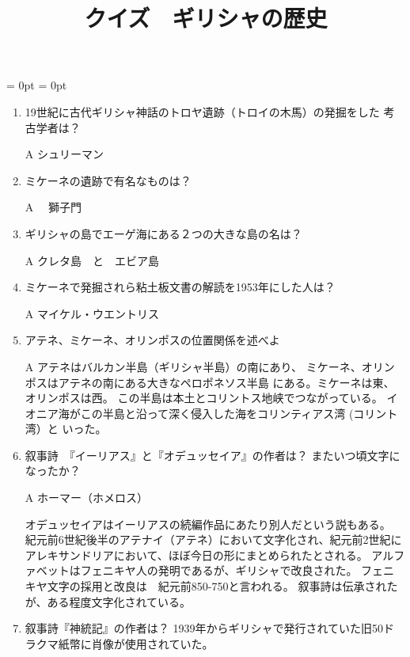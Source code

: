 \documentclass[fleqn]{article}
\begin{document}
\title{クイズ　ギリシャの歴史}
\maketitle
\hoffset = 0pt
\voffset = 0pt
\topmargin=0pt
\textheight=21cm
\headheight=0pt
\headsep=0pt


\begin{enumerate}
\item{19世紀に古代ギリシャ神話のトロヤ遺跡（トロイの木馬）の発掘をした
考古学者は？

\vspace{1zw}A 	シュリーマン
}


\item{ミケーネの遺跡で有名なものは？

\vspace{1zw}A 　獅子門

}
\item{ギリシャの島でエーゲ海にある２つの大きな島の名は？

\vspace{1zw}A クレタ島　と　エビア島

}
\item{ミケーネで発掘されら粘土板文書の解読を1953年にした人は？

\vspace{1zw}A マイケル・ウエントリス
}
\item{アテネ、ミケーネ、オリンポスの位置関係を述べよ

\vspace{1zw}A アテネはバルカン半島（ギリシャ半島）の南にあり、
ミケーネ、オリンポスはアテネの南にある大きなペロポネソス半島
にある。ミケーネは東、オリンポスは西。
この半島は本土とコリントス地峡でつながっている。
イオニア海がこの半島と沿って深く侵入した海をコリンティアス湾
(コリント湾）と	いった。

}
\item{叙事詩　『イーリアス』と『オデュッセイア』の作者は？
またいつ頃文字になったか？

\vspace{1zw}A ホーマー（ホメロス）

オデュッセイアはイーリアスの続編作品にあたり別人だという説もある。
紀元前6世紀後半のアテナイ（アテネ）において文字化され、紀元前2世紀に
アレキサンドリアにおいて、ほぼ今日の形にまとめられたとされる。
アルファベットはフェニキヤ人の発明であるが、ギリシャで改良された。
フェニキヤ文字の採用と改良は　紀元前850-750と言われる。
叙事詩は伝承されたが、ある程度文字化されている。

}
\item{叙事詩『神統記』の作者は？
1939年からギリシャで発行されていた旧50ドラクマ紙幣に肖像が使用されていた。



}
\end{enumerate}
\end{document}
